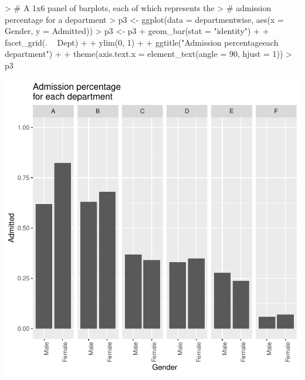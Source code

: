 \documentclass[12pt,letterpaper,final]{article}
\begin{document}
\begin{Schunk}
\begin{Sinput}
> # A 1x6 panel of barplots, each of which represents the 
> # admission percentage for a department
> p3 <- ggplot(data = departmentwise, aes(x = Gender, y = Admitted))
> p3 <- p3 + geom_bar(stat = "identity") + 
+   facet_grid(. ~ Dept) + 
+   ylim(0, 1) +
+   ggtitle("Admission percentage\nfor each department") + 
+   theme(axis.text.x = element_text(angle = 90, hjust = 1))
> p3
\end{Sinput}
\end{Schunk}
\includegraphics{lect_main-018}
\end{document}
